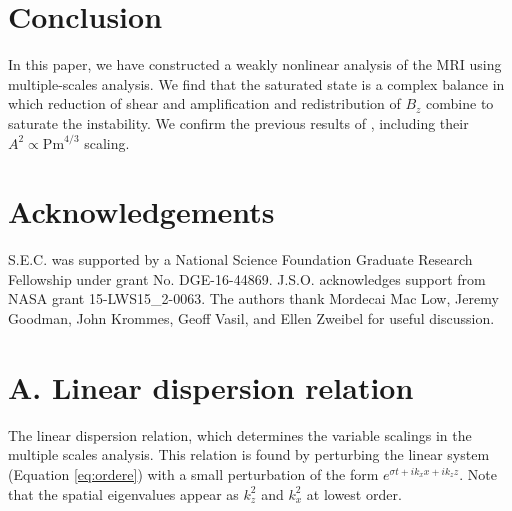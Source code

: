 \documentclass{emulateapj}
\newcommand{\Pm}{\mathrm{Pm}}
\begin{document}
\section{Conclusion}
\label{sec:conclusion}

In this paper, we have constructed a weakly nonlinear analysis of the MRI using multiple-scales analysis. We find that the saturated state is a complex balance in which reduction of shear and amplification and redistribution of $B_z$ combine to saturate the instability. We confirm the previous results of \citet{Umurhan:2007hs}, including their $A^2 \propto \Pm^{4/3} $ scaling. 

\section{Acknowledgements}
S.E.C. was supported by a National Science Foundation Graduate Research Fellowship under grant No. DGE-16-44869. J.S.O. acknowledges support from NASA grant 15-LWS15\_2-0063. The authors thank Mordecai Mac Low, Jeremy Goodman, John Krommes, Geoff Vasil, and Ellen Zweibel for useful discussion.


\clearpage
\appendix

\section{A. Linear dispersion relation}\label{app:dispersion}

The linear dispersion relation, which determines the variable scalings in the multiple scales analysis. This relation is found by perturbing the linear system (Equation \ref{eq:ordere}) with a small perturbation of the form $e^{\sigma t + i k_x x + i k_z z}$. Note that the spatial eigenvalues appear as $k_z^2$ and $k_x^2$ at lowest order.
\end{document}
